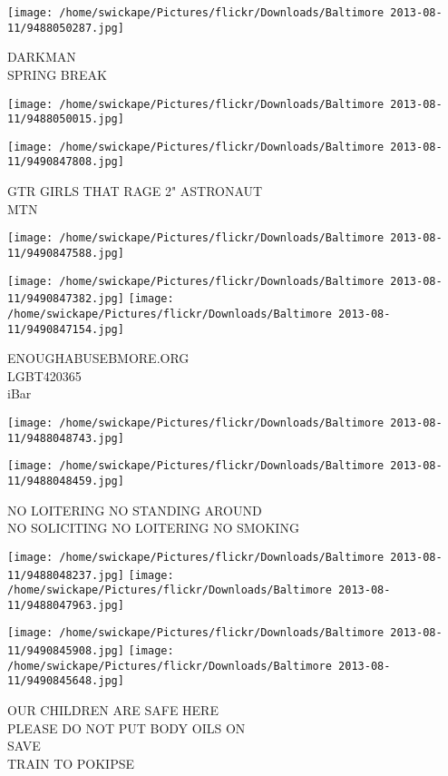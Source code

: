 \documentclass[10pt,letterpaper]{article}
\begin{document}
\vspace{0.25in}
\texttt{[image: /home/swickape/Pictures/flickr/Downloads/Baltimore 2013-08-11/9488050287.jpg]}

DARKMAN\\
SPRING BREAK
\pagebreak

\texttt{[image: /home/swickape/Pictures/flickr/Downloads/Baltimore 2013-08-11/9488050015.jpg]}

\vspace{0.25in}
\texttt{[image: /home/swickape/Pictures/flickr/Downloads/Baltimore 2013-08-11/9490847808.jpg]}

GTR GIRLS THAT RAGE 2" ASTRONAUT\\
MTN
\pagebreak

\texttt{[image: /home/swickape/Pictures/flickr/Downloads/Baltimore 2013-08-11/9490847588.jpg]}

\vspace{0.25in}
\texttt{[image: /home/swickape/Pictures/flickr/Downloads/Baltimore 2013-08-11/9490847382.jpg]}
\texttt{[image: /home/swickape/Pictures/flickr/Downloads/Baltimore 2013-08-11/9490847154.jpg]}

ENOUGHABUSEBMORE.ORG\\
LGBT420365\\
iBar
\pagebreak

\texttt{[image: /home/swickape/Pictures/flickr/Downloads/Baltimore 2013-08-11/9488048743.jpg]}

\vspace{0.25in}
\texttt{[image: /home/swickape/Pictures/flickr/Downloads/Baltimore 2013-08-11/9488048459.jpg]}

NO LOITERING NO STANDING AROUND\\
NO SOLICITING NO LOITERING NO SMOKING
\pagebreak

\texttt{[image: /home/swickape/Pictures/flickr/Downloads/Baltimore 2013-08-11/9488048237.jpg]}
\texttt{[image: /home/swickape/Pictures/flickr/Downloads/Baltimore 2013-08-11/9488047963.jpg]}

\texttt{[image: /home/swickape/Pictures/flickr/Downloads/Baltimore 2013-08-11/9490845908.jpg]}
\texttt{[image: /home/swickape/Pictures/flickr/Downloads/Baltimore 2013-08-11/9490845648.jpg]}

OUR CHILDREN ARE SAFE HERE\\
PLEASE DO NOT PUT BODY OILS ON\\
SAVE\\
TRAIN TO POKIPSE
\pagebreak
\end{document}
